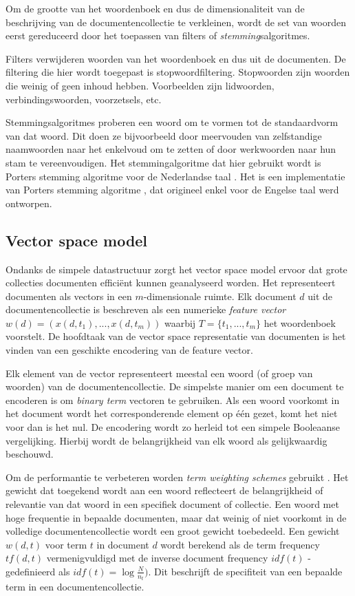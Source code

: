 Om de grootte van het woordenboek en dus de dimensionaliteit van de beschrijving van de documentencollectie te verkleinen, wordt de set van woorden eerst gereduceerd door het toepassen van filters of \textit{stemming}salgoritmes. 

Filters verwijderen woorden van het woordenboek en dus uit de documenten. De filtering die hier wordt toegepast is stopwoordfiltering. Stopwoorden zijn woorden die weinig of geen inhoud hebben. Voorbeelden zijn lidwoorden, verbindingswoorden, voorzetsels, etc. 

Stemmingsalgoritmes proberen een woord om te vormen tot de standaardvorm van dat woord. Dit doen ze bijvoorbeeld door meervouden van zelfstandige naamwoorden naar het enkelvoud om te zetten of door werkwoorden naar hun stam te vereenvoudigen. Het stemmingalgoritme dat hier gebruikt wordt is Porters stemming algoritme voor de Nederlandse taal \cite{Kraaij1994}. Het is een implementatie van Porters stemming algoritme \cite{Porter1980}, dat origineel enkel voor de Engelse taal werd ontworpen.

\subsection{Vector space model}\label{vector-space-model}
Ondanks de simpele datastructuur zorgt het vector space model ervoor dat grote collecties documenten effici\"ent kunnen geanalyseerd worden. Het representeert documenten als vectors in een $m$-dimensionale ruimte. Elk document $d$ uit de documentencollectie is beschreven als een numerieke\textit{ feature vector} $w(d) = (x(d,t_1),...,x(d,t_m))$ waarbij $T=\{t_1,...,t_m\}$ het woordenboek voorstelt. De hoofdtaak van de vector space representatie van documenten is het vinden van een geschikte encodering van de feature vector. 

Elk element van de vector representeert meestal een woord (of groep van woorden) van de documentencollectie. De simpelste manier om een document te encoderen is om \textit{binary term} vectoren te gebruiken. Als een woord voorkomt in het document wordt het corresponderende element op \'e\'en gezet, komt het niet voor dan is het nul. De encodering wordt zo herleid tot een simpele Booleaanse vergelijking. Hierbij wordt de belangrijkheid van elk woord als gelijkwaardig beschouwd. 

Om de performantie te verbeteren worden \textit{term weighting schemes} gebruikt \cite{Salton1988}. Het gewicht dat toegekend wordt aan een woord reflecteert de belangrijkheid of relevantie van dat woord in een specifiek document of collectie. Een woord met hoge frequentie in bepaalde documenten, maar dat weinig of niet voorkomt in de volledige documentencollectie wordt een groot gewicht toebedeeld. Een gewicht $w(d,t)$ voor term $t$ in document $d$ wordt berekend als de term frequency $tf(d,t)$ vermenigvuldigd met de inverse document frequency $idf(t)$ - gedefinieerd als $idf(t)=\log{\frac{N}{n_t}})$. Dit beschrijft de specifiteit van een bepaalde term in een documentencollectie. 


